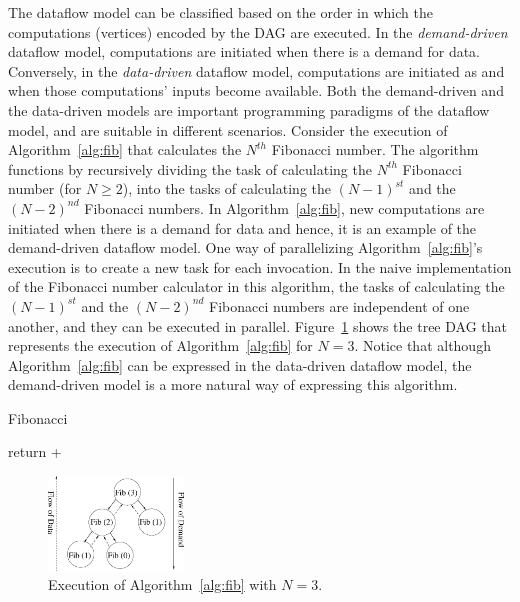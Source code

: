 \documentclass[10pt,conference]{IEEEtran}
\begin{document}
The dataflow model can be classified based on the order in which the
computations (vertices) encoded by the DAG are executed. In the
\textit{demand-driven} dataflow model, computations are initiated when there is
a demand for data.  Conversely, in the \textit{data-driven} dataflow model,
computations are initiated as and when those computations' inputs become
available.  Both the demand-driven and the data-driven models are important
programming paradigms of the dataflow model, and are suitable in different
scenarios.  Consider the execution of Algorithm~\ref{alg:fib} that calculates
the $N^{th}$ Fibonacci number. The algorithm functions by recursively dividing
the task of calculating the $N^{th}$ Fibonacci number (for $N \ge 2$), into the
tasks of calculating the $(N-1)^{st}$ and the $(N-2)^{nd}$ Fibonacci numbers.
In Algorithm~\ref{alg:fib}, new computations are initiated when there is a
demand for data and hence, it is an example of the demand-driven dataflow
model. One way of parallelizing Algorithm~\ref{alg:fib}'s execution is to
create a new task for each invocation. In the naive implementation of the
Fibonacci number calculator in this algorithm, the tasks of calculating the
$(N-1)^{st}$ and the $(N-2)^{nd}$ Fibonacci numbers are independent of one
another, and they can be executed in parallel.  Figure~\ref{fig:fibo} shows the
tree DAG that represents the execution of Algorithm~\ref{alg:fib} for $N=3$.
Notice that although Algorithm~\ref{alg:fib} can be expressed in the
data-driven dataflow model, the demand-driven model is a more natural way of
expressing this algorithm.

\begin{algorithm}[t]

\caption{Fibonacci}
\label{alg:fib}


return  + 
\end{algorithm}

\begin{figure}[b]
\begin{center}
\includegraphics[width=0.32\textwidth]{figs/fib.eps}
\caption{Execution of Algorithm~\ref{alg:fib} with $N=3$.}
\label{fig:fibo}
\end{center}
\end{figure}
\end{document}
